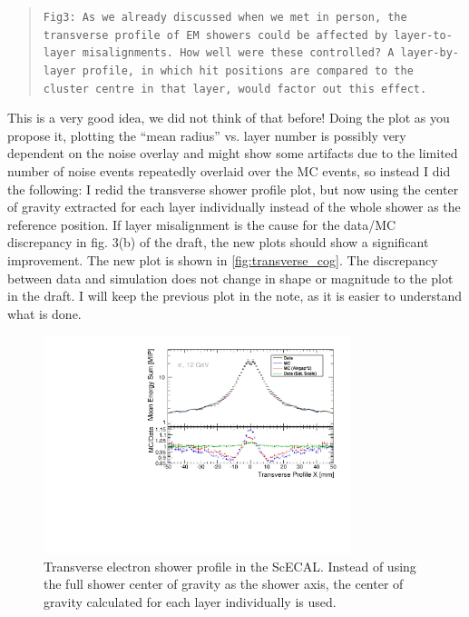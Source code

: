 \documentclass[twoside,a4paper,12pt]{article}
\begin{document}
\begin{quote}\texttt{Fig3: As we already discussed when we met in person, the transverse profile of EM showers could be affected by layer-to-layer
misalignments. How well were these controlled?
A layer-by-layer profile, in which hit positions are compared to the cluster centre in that layer, would factor out this
effect.}\end{quote}
This is a very good idea, we did not think of that before! Doing the plot as you propose it, plotting the ``mean radius'' vs. layer number is possibly very dependent on the noise overlay and might show some artifacts due to the limited number of noise events repeatedly overlaid over the MC events, so instead I did the following:   
I redid the transverse shower profile plot, but now using the center of gravity extracted for each layer individually instead of the whole shower as the reference position. If layer misalignment is the cause for the data/MC discrepancy in fig. 3(b) of the draft, the new plots should show a significant improvement. The new plot is shown in \autoref{fig:transverse_cog}. The discrepancy between data and simulation does not change in shape or magnitude to the plot in the draft. I will keep the previous plot in the note, as it is easier to understand what is done.

\begin{figure}[htbp]
\begin{center}
\includegraphics[width=0.8\textwidth,page=1]{out_profileRadial_LayerCoG_560294_12GeV}
\caption{Transverse electron shower profile in the ScECAL. Instead of using the full shower center of gravity as the shower axis, the center of gravity calculated for each layer individually is used.}
\label{fig:transverse_cog}
\end{center}
\end{figure}
\end{document}
